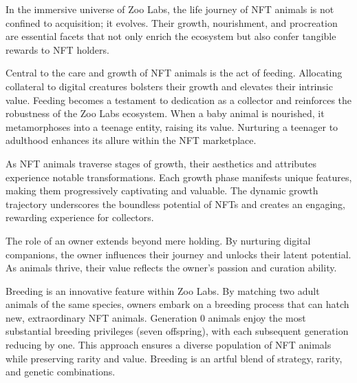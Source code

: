 In the immersive universe of Zoo Labs, the life journey of NFT animals is not confined to acquisition; it evolves. Their growth, nourishment, and procreation are essential facets that not only enrich the ecosystem but also confer tangible rewards to NFT holders.

Central to the care and growth of NFT animals is the act of feeding. Allocating collateral to digital creatures bolsters their growth and elevates their intrinsic value. Feeding becomes a testament to dedication as a collector and reinforces the robustness of the Zoo Labs ecosystem. When a baby animal is nourished, it metamorphoses into a teenage entity, raising its value. Nurturing a teenager to adulthood enhances its allure within the NFT marketplace.

As NFT animals traverse stages of growth, their aesthetics and attributes experience notable transformations. Each growth phase manifests unique features, making them progressively captivating and valuable. The dynamic growth trajectory underscores the boundless potential of NFTs and creates an engaging, rewarding experience for collectors.

The role of an owner extends beyond mere holding. By nurturing digital companions, the owner influences their journey and unlocks their latent potential. As animals thrive, their value reflects the owner's passion and curation ability.

Breeding is an innovative feature within Zoo Labs. By matching two adult animals of the same species, owners embark on a breeding process that can hatch new, extraordinary NFT animals. Generation 0 animals enjoy the most substantial breeding privileges (seven offspring), with each subsequent generation reducing by one. This approach ensures a diverse population of NFT animals while preserving rarity and value. Breeding is an artful blend of strategy, rarity, and genetic combinations.
